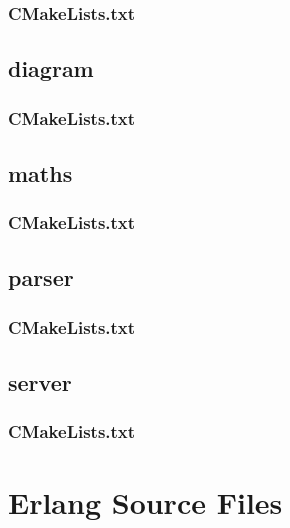 \subsubsection*{CMakeLists.txt}


\subsection*{diagram}

\subsubsection*{CMakeLists.txt}


\subsection*{maths}

\subsubsection*{CMakeLists.txt}


\subsection*{parser}

\subsubsection*{CMakeLists.txt}


\subsection*{server}

\subsubsection*{CMakeLists.txt}


\section{Erlang Source Files}

